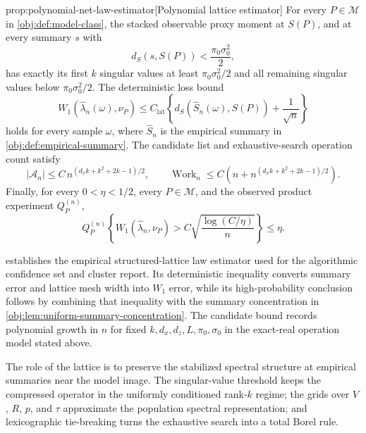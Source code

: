 \begin{propositionv}{prop:polynomial-net-law-estimator}[Polynomial lattice estimator]
For every \(P\in\mathcal M\) in \cref{obj:def:model-class}, the stacked observable proxy moment at \(S(P)\), and at every summary \(s\) with
\[
d_S(s,S(P))<\frac{\pi_0\sigma_0^2}{2},
\]
has exactly its first \(k\) singular values at least \(\pi_0\sigma_0^2/2\) and all remaining singular values below \(\pi_0\sigma_0^2/2\).  The deterministic loss bound
\[
W_1(\widehat\lambda_n(\omega),\nu_P)
\le
C_{\mathrm{lat}}\left\{
d_S(\widehat S_n(\omega),S(P))+\frac{1}{\sqrt n}
\right\}
\]
holds for every sample \(\omega\), where \(\widehat S_n\) is the empirical summary in \cref{obj:def:empirical-summary}.  The candidate list and exhaustive-search operation count satisfy
\[
|\mathcal A_n|
\le C\, n^{(d_xk+k^2+2k-1)/2},
\qquad
\operatorname{Work}_n
\le
C\left(n+n^{(d_xk+k^2+2k-1)/2}\right).
\]
Finally, for every \(0<\eta<1/2\), every \(P\in\mathcal M\), and the observed product experiment \(Q_P^{(n)}\),
\[
Q_P^{(n)}\!\left\{
W_1(\widehat\lambda_n,\nu_P)>
C\sqrt{\frac{\log(C/\eta)}{n}}
\right\}
\le \eta .
\]
\end{propositionv}

 establishes the empirical structured-lattice law estimator used for the algorithmic confidence set and cluster report. Its deterministic inequality converts summary error and lattice mesh width into \(W_1\) error, while its high-probability conclusion follows by combining that inequality with the summary concentration in \cref{obj:lem:uniform-summary-concentration}. The candidate bound records polynomial growth in \(n\) for fixed \(k,d_x,d_z,L,\pi_0,\sigma_0\) in the exact-real operation model stated above.

The role of the lattice is to preserve the stabilized spectral structure at empirical summaries near the model image. The singular-value threshold keeps the compressed operator in the uniformly conditioned rank-\(k\) regime; the grids over \(V\), \(R\), \(p\), and \(\tau\) approximate the population spectral representation; and lexicographic tie-breaking turns the exhaustive search into a total Borel rule.

